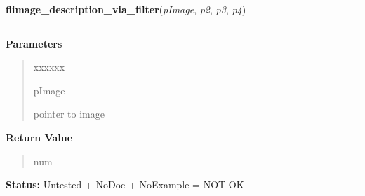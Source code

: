 \hspace{.8\funcindent}\begin{boxedminipage}{\funcwidth}

    \raggedright \textbf{flimage\_description\_via\_filter}(\textit{pImage}, \textit{p2}, \textit{p3}, \textit{p4})

    \vspace{-1.5ex}

    \rule{\textwidth}{0.5\fboxrule}
\setlength{\parskip}{2ex}
\setlength{\parskip}{1ex}
      \textbf{Parameters}
      \vspace{-1ex}

      \begin{quote}
        \begin{Ventry}{xxxxxx}

          \item[pImage]

          pointer to image

        \end{Ventry}

      \end{quote}

      \textbf{Return Value}
    \vspace{-1ex}

      \begin{quote}
      num

      \end{quote}

\textbf{Status:} Untested + NoDoc + NoExample = NOT OK



    \end{boxedminipage}

    \label{xformslib:library:flimage_write_via_filter}

    \vspace{0.5ex}

